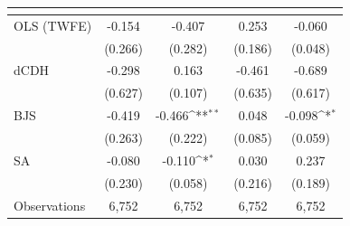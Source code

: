 {
\def\sym#1{\ifmmode^{#1}\else\(^{#1}\)\fi}
\begin{tabular}{l*{4}{c}}
\toprule
            &&&&\\
\midrule
OLS (TWFE) & -0.154 & -0.407 & 0.253 & -0.060 \\
             & (0.266) & (0.282) & (0.186) & (0.048) \\
dCDH & -0.298 & 0.163 & -0.461 & -0.689 \\
             & (0.627) & (0.107) & (0.635) & (0.617) \\
BJS & -0.419 & -0.466\sym{**} & 0.048 & -0.098\sym{*} \\
             & (0.263) & (0.222) & (0.085) & (0.059) \\
SA & -0.080 & -0.110\sym{*} & 0.030 & 0.237 \\
             & (0.230) & (0.058) & (0.216) & (0.189) \\
\midrule
Observations & 6,752 & 6,752 & 6,752 & 6,752 \\
\bottomrule
\end{tabular}
}

